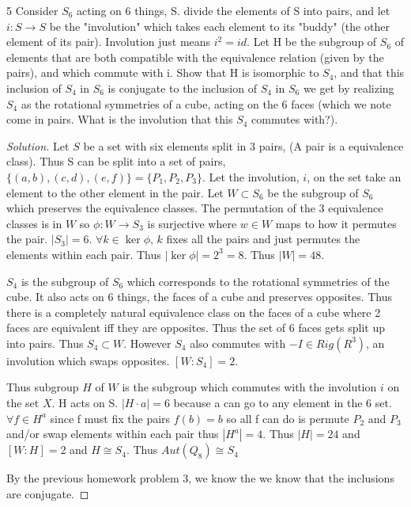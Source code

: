 \documentclass{article}
\newenvironment{solution}
{\renewcommand\qedsymbol{$\blacksquare$}\begin{proof}[Solution]}
{\end{proof}}
\begin{document}
\begin{PROB}{5}\label{Problem 5.}
    Consider $S_6$ acting on 6 things, S. divide the elements of S into pairs, and let $i: S \to S$ be the "involution" which takes each element to its "buddy" (the other element of its pair). Involution just means $i^2 = id$. Let H be the subgroup of $S_6$ of elements that are both compatible with the equivalence relation (given by the pairs), and which commute with i.  Show that H is isomorphic to $S_4$, and that this inclusion of $S_4$ in $S_6$ is conjugate to the inclusion of $S_4$ in $S_6$ we get by realizing $S_4$ as the rotational symmetries of a cube, acting on the 6 faces  (which we note come in pairs.  What is the involution that this $S_4$ commutes with?). 
\end{PROB}
\begin{solution}
    Let $S$ be a set with six elements split in 3 pairs, (A pair is a equivalence class). Thus S can be split into a set of pairs, $\{(a, b), (c, d), (e, f)\} = \{P_1, P_2, P_3\}$. Let the involution, $i$, on the set take an element to the other element in the pair. Let $W \subset S_6$ be the subgroup of $S_6$ which preserves the equivalence classes. The permutation of the 3 equivalence classes is in $W$ so $\phi: W \to S_3$ is surjective where $w \in W$ maps to how it permutes the pair. $|S_3| = 6$. $\forall k \in \ker \phi$, $k$ fixes all the pairs and just permutes the elements within each pair. Thus $|\ker \phi| = 2^3 = 8$. Thus $|W| = 48$. 

    $S_4$ is the subgroup of $S_6$ which corresponds to the rotational symmetries of the cube. It also acts on 6 things, the faces of a cube and preserves opposites. Thus there is a completely natural equivalence class on the faces of a cube where 2 faces are equivalent iff they are opposites. Thus the set of 6 faces gets split up into pairs. Thus $S_4 \subset W$. However $S_4$ also commutes with $-I \in Rig(R^3)$, an involution which swaps opposites. $[W : S_4] = 2$.


    Thus subgroup $H$ of $W$ is the subgroup which commutes with the involution $i$ on the set $X$. H acts on S. $|H \cdot a| = 6$ because a can go to any element in the 6 set. $\forall f \in H^a$ since f must fix the pairs $f(b) = b$ so all f can do is permute $P_2$ and $P_3$ and/or swap elements within each pair thus $|H^a| = 4$. Thus $|H| = 24$ and $[W: H] = 2$ and $H \cong S_4$. Thus $Aut(Q_8) \cong S_4$

    By the previous homework problem 3, we know the we know that the inclusions are conjugate.

\end{solution}
\end{document}
